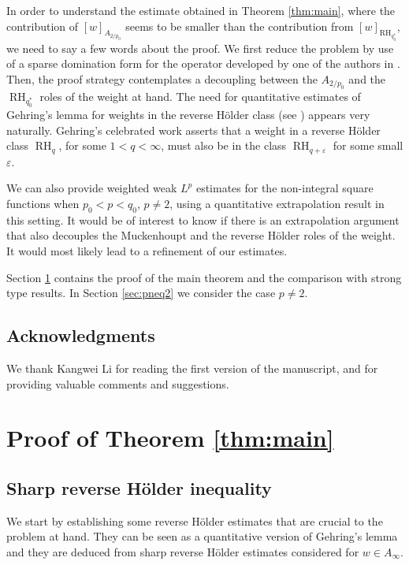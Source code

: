 \documentclass[11pt,reqno]{amsart}
\theoremstyle{plain} %
\newcommand{\1}{ \mathbbm{1}}   %
\theoremstyle{definition}
\theoremstyle{remark}
\numberwithin{equation}{section}
\begin{document}
In order to understand the estimate obtained in Theorem \ref{thm:main}, where the contribution of $ [w]_{A_{2/p_0}}$ seems to be smaller than the contribution from $[w]_{ \operatorname{RH}_{q_0^*}}$, we need to say a few words about the proof. We first reduce the problem by use of a sparse domination form for the operator developed by one of the authors in \cite{BBR}. Then, the proof strategy contemplates a decoupling between the $A_{2/p_0}$ and the $\operatorname{RH}_{q_0^*}$ roles of the weight at hand. The need for quantitative estimates of Gehring's lemma for weights in the reverse H\"older class (see \cite{G}) appears very naturally. Gehring's celebrated work asserts that a weight in a reverse H\"older class $\operatorname{RH}_q$, for some $1<q<\infty$, must also be in the class $\operatorname{RH}_{q+\varepsilon}$ for some small $\varepsilon$. 

We can also provide weighted weak $L^p$ estimates for the non-integral square functions when $p_0 < p < q_0$, $p \neq 2$, using a quantitative extrapolation result in this setting. It would be of interest to know if there is an extrapolation argument that also decouples the Muckenhoupt and the reverse H\"older roles of the weight. It would most likely lead to a refinement of our estimates.

Section \ref{sec:proof} contains the proof of the main theorem and the comparison with strong type results. In Section \ref{sec:pneq2} we consider the case $p\neq 2$.



\subsection*{Acknowledgments} We thank Kangwei Li for reading the first version of the manuscript, and for providing valuable comments and suggestions. 



\section{Proof of Theorem \ref{thm:main}}
\label{sec:proof}

\subsection{Sharp reverse H\"older inequality}

We start by establishing some reverse H\"older estimates that are crucial to the problem at hand. They can be seen as a quantitative version of Gehring's lemma and they are deduced from sharp reverse H\"older estimates considered for $w\in A_{\infty}$.
\end{document}
